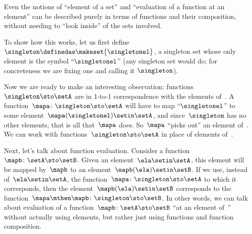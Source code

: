\begin{example}
    Even the notions of ``element of a set'' and ``evaluation of a function at an element'' can be described purely in terms of functions and their composition, without needing to ``look inside'' of the sets involved.

    To show how this works, let us first define $\singleton \definedas \makeset{\singletonel}$, a singleton set whose only element is the symbol ``$\singletonel$'' (any singleton set would do; for concreteness we are fixing one and calling it $\singleton$).

    Now we are ready to make an interesting observation: functions~$\singleton \sto \setA$ are in 1-to-1 correspondence with the elements of~\setA.
    A function~$\mapa\colon \singleton \sto \setA$ will have to map ``$\singletonel$'' to some element~$\mapa(\singletonel) \setin\setA$, and since~$\singleton$ has no other elements, that is all that~$\mapa$ does.
    So~$\mapa$ ``picks out'' an element of~\setA.
    We can work with functions~$\singleton \sto \setA$ in place of elements of~\setA.

    Next, let's talk about function evaluation.
    Consider a function~$\mapb \colon \setA \sto \setB$.
    Given an element~$\ela \setin\setA$, this element will be mapped by~$\mapb$ to an element~$\mapb(\ela) \setin\setB$.
    If we use, instead of~$\ela \setin\setA$, the function~$\mapa \colon \singleton \sto \setA$ to which it corresponds, then the element~$\mapb(\ela) \setin\setB$ corresponds to the function~$\mapa \mthen \mapb\colon \singleton \sto \setB$.
    In other words, we can talk about evaluation of a function~$\mapb \colon \setA \sto \setB$ ``at an element of~\setA'' without actually using elements, but rather just using functions and function composition.
\end{example}

